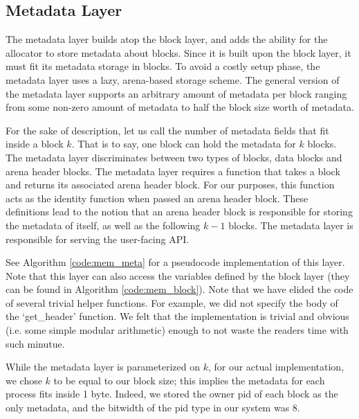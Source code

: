 \documentclass[12pt]{report}
\begin{document}
\subsection{Metadata Layer}
    The metadata layer builds atop the block layer, and adds the ability for the
    allocator to store metadata about blocks. Since it is built upon the block
    layer, it must fit its metadata storage in blocks. To avoid a costly setup
    phase, the metadata layer uses a lazy, arena-based storage scheme. The
    general version of the metadata layer supports an arbitrary amount of
    metadata per block ranging from some non-zero amount of metadata to half the
    block size worth of metadata.

    For the sake of description, let us call the number of metadata fields that
    fit inside a block $k$. That is to say, one block can hold the metadata for
    $k$ blocks. The metadata layer discriminates between two types of blocks,
    data blocks and arena header blocks. The metadata layer requires a function
    that takes a block and returns its associated arena header block. For our
    purposes, this function acts as the identity function when passed an arena
    header block. These definitions lead to the notion that an arena header
    block is responsible for storing the metadata of itself, as well as the
    following $k-1$ blocks. The metadata layer is responsible for serving the
    user-facing API.

    See Algorithm \ref{code:mem_meta} for a pseudocode implementation of this
    layer. Note that this layer can also access the variables defined by the
    block layer (they can be found in Algorithm \ref{code:mem_block}). Note that
    we have elided the code of several trivial helper functions. For example, we
    did not specify the body of the `get\_header' function. We felt that the
    implementation is trivial and obvious (i.e. some simple modular arithmetic)
    enough to not waste the readers time with such minutue.

    While the metadata layer is parameterized on $k$, for our actual
    implementation, we chose $k$ to be equal to our block size; this implies
    the metadata for each process fits inside 1 byte. Indeed, we stored the
    owner pid of each block as the only metadata, and the bitwidth of the pid
    type in our system was 8.
\end{document}
